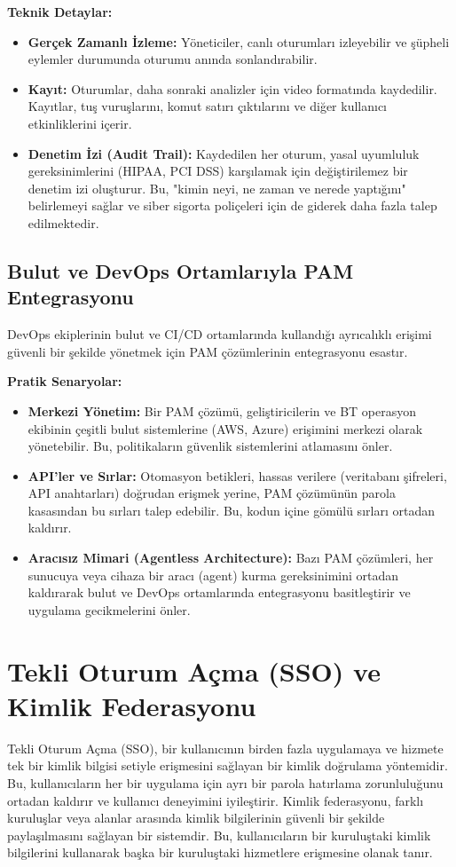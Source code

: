 \textbf{Teknik Detaylar:}
\begin{itemize}
    \item \textbf{Gerçek Zamanlı İzleme:} Yöneticiler, canlı oturumları izleyebilir ve şüpheli eylemler durumunda oturumu anında sonlandırabilir.
    \item \textbf{Kayıt:} Oturumlar, daha sonraki analizler için video formatında kaydedilir. Kayıtlar, tuş vuruşlarını, komut satırı çıktılarını ve diğer kullanıcı etkinliklerini içerir.
    \item \textbf{Denetim İzi (Audit Trail):} Kaydedilen her oturum, yasal uyumluluk gereksinimlerini (HIPAA, PCI DSS) karşılamak için değiştirilemez bir denetim izi oluşturur. Bu, "kimin neyi, ne zaman ve nerede yaptığını" belirlemeyi sağlar ve siber sigorta poliçeleri için de giderek daha fazla talep edilmektedir.
\end{itemize}

\subsection{Bulut ve DevOps Ortamlarıyla PAM Entegrasyonu}

DevOps ekiplerinin bulut ve CI/CD ortamlarında kullandığı ayrıcalıklı erişimi güvenli bir şekilde yönetmek için PAM çözümlerinin entegrasyonu esastır.

\textbf{Pratik Senaryolar:}
\begin{itemize}
    \item \textbf{Merkezi Yönetim:} Bir PAM çözümü, geliştiricilerin ve BT operasyon ekibinin çeşitli bulut sistemlerine (AWS, Azure) erişimini merkezi olarak yönetebilir. Bu, politikaların güvenlik sistemlerini atlamasını önler.
    \item \textbf{API'ler ve Sırlar:} Otomasyon betikleri, hassas verilere (veritabanı şifreleri, API anahtarları) doğrudan erişmek yerine, PAM çözümünün parola kasasından bu sırları talep edebilir. Bu, kodun içine gömülü sırları ortadan kaldırır.
    \item \textbf{Aracısız Mimari (Agentless Architecture):} Bazı PAM çözümleri, her sunucuya veya cihaza bir aracı (agent) kurma gereksinimini ortadan kaldırarak bulut ve DevOps ortamlarında entegrasyonu basitleştirir ve uygulama gecikmelerini önler.
\end{itemize}

\section{Tekli Oturum Açma (SSO) ve Kimlik Federasyonu}
Tekli Oturum Açma (SSO), bir kullanıcının birden fazla uygulamaya ve hizmete tek bir kimlik bilgisi setiyle erişmesini sağlayan bir kimlik doğrulama yöntemidir. Bu, kullanıcıların her bir uygulama için ayrı bir parola hatırlama zorunluluğunu ortadan kaldırır ve kullanıcı deneyimini iyileştirir. Kimlik federasyonu, farklı kuruluşlar veya alanlar arasında kimlik bilgilerinin güvenli bir şekilde paylaşılmasını sağlayan bir sistemdir. Bu, kullanıcıların bir kuruluştaki kimlik bilgilerini kullanarak başka bir kuruluştaki hizmetlere erişmesine olanak tanır.


